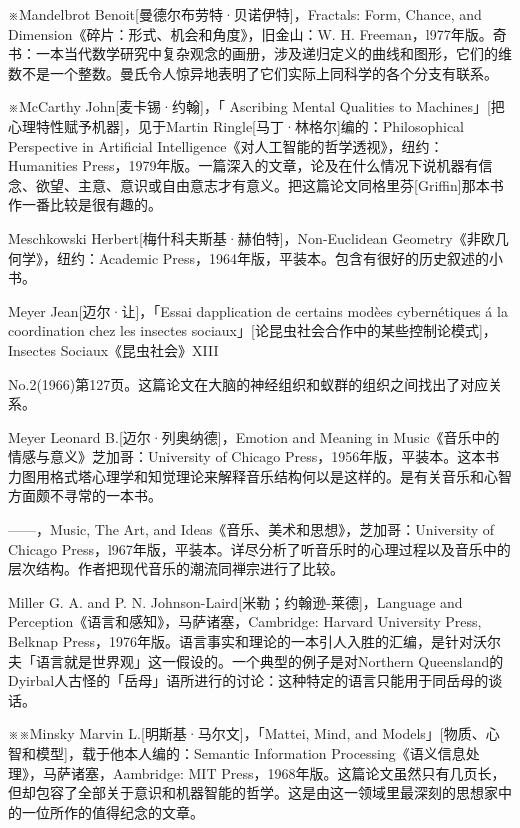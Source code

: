 \documentclass[
  12pt,
  twoside,
  openright,
  oldfontcommands,
]{memoir}
\begin{document}
※Mandelbrot Benoit{[}曼德尔布劳特·贝诺伊特{]}，Fractals: Form, Chance,
and Dimension《碎片：形式、机会和角度》，旧金山：W. H.
Freeman，l977年版。奇书：一本当代数学研究中复杂观念的画册，涉及递归定义的曲线和图形，它们的维数不是一个整数。曼氏令人惊异地表明了它们实际上同科学的各个分支有联系。

※McCarthy John{[}麦卡锡·约翰{]}，「 Ascribing Mental Qualities to
Machines」{[}把心理特性赋予机器{]}，见于Martin
Ringle{[}马丁·林格尔{]}编的：Philosophical Perspective in Artificial
Intelligence《对人工智能的哲学透视》，纽约：Humanities
Press，1979年版。一篇深入的文章，论及在什么情况下说机器有信念、欲望、主意、意识或自由意志才有意义。把这篇论文同格里芬{[}Griffin{]}那本书作一番比较是很有趣的。

Meschkowski Herbert{[}梅什科夫斯基·赫伯特{]}，Non-Euclidean
Geometry《非欧几何学》，纽约：Academic
Press，1964年版，平装本。包含有很好的历史叙述的小书。

Meyer Jean{[}迈尔·让{]}，「Essai d\textquotesingle application de
certains modèes cybernétiques á la coordination chez les insectes
sociaux」{[}论昆虫社会合作中的某些控制论模式{]}，Insectes
Sociaux《昆虫社会》XIII

No.2(1966)第127页。这篇论文在大脑的神经组织和蚁群的组织之间找出了对应关系。

Meyer Leonard B.{[}迈尔·列奥纳德{]}，Emotion and Meaning in
Music《音乐中的情感与意义》芝加哥：University of Chicago
Press，1956年版，平装本。这本书力图用格式塔心理学和知觉理论来解释音乐结构何以是这样的。是有关音乐和心智方面颇不寻常的一本书。

------，Music, The Art, and
Ideas《音乐、美术和思想》，芝加哥：University of Chicago
Press，l967年版，平装本。详尽分析了听音乐时的心理过程以及音乐中的层次结构。作者把现代音乐的潮流同禅宗进行了比较。

Miller G. A. and P. N. Johnson-Laird{[}米勒；约翰逊-莱德{]}，Language
and Perception《语言和感知》，马萨诸塞，Cambridge: Harvard University
Press, Belknap
Press，1976年版。语言事实和理论的一本引人入胜的汇编，是针对沃尔夫「语言就是世界观」这一假设的。一个典型的例子是对Northern
Queensland的Dyirbal人古怪的「岳母」语所进行的讨论：这种特定的语言只能用于同岳母的谈话。

※※Minsky Marvin L.{[}明斯基·马尔文{]}，「Mattei, Mind, and
Models」{[}物质、心智和模型{]}，载于他本人编的：Semantic Information
Processing《语义信息处理》，马萨诸塞，Aambridge: MIT
Press，1968年版。这篇论文虽然只有几页长，但却包容了全部关于意识和机器智能的哲学。这是由这一领域里最深刻的思想家中的一位所作的值得纪念的文章。
\end{document}
